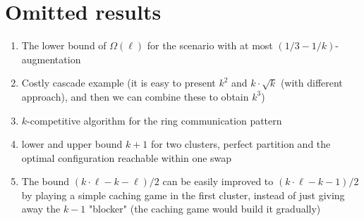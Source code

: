 \documentclass[manuscript,screen=true, review, anonymous]{acmart}
\begin{document}

  

\pagebreak
\appendix


\section{Omitted results}

\begin{enumerate}
	\item The lower bound of $\Omega(\ell)$ for the scenario with at most $(1/3-1/k)$-augmentation
	
	\item Costly cascade example (it is easy to present $k^2$ and $k\cdot \sqrt{k}$ (with different approach), and then we can combine these to obtain $k^3$)
	
	\item $k$-competitive algorithm for the ring communication pattern
	
	\item lower and upper bound $k+1$ for two clusters, perfect partition and the optimal configuration reachable within one swap
	\item 
	The bound $(k \cdot \ell - k - \ell) / 2$ can be easily improved to $(k \cdot \ell - k - 1) / 2$ by playing a simple caching game in the first cluster, instead of just giving away the $k-1$ "blocker" (the caching game would build it gradually)
	
\end{enumerate}
\end{document}
